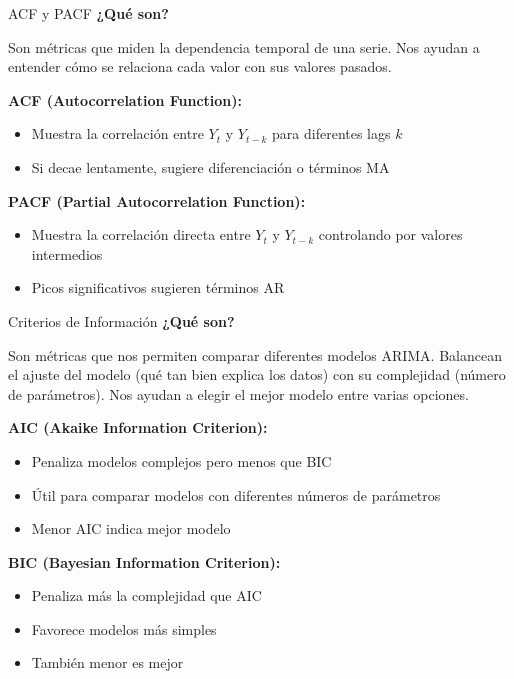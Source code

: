\documentclass{beamer}
\begin{document}
\begin{frame}{ACF y PACF}
    \textbf{¿Qué son?}
    
    Son métricas que miden la dependencia temporal de una serie. Nos ayudan a entender cómo se relaciona cada valor con sus valores pasados.
    
    \textbf{ACF (Autocorrelation Function):}
    \begin{itemize}
        \item Muestra la correlación entre $Y_t$ y $Y_{t-k}$ para diferentes lags $k$
        \item Si decae lentamente, sugiere diferenciación o términos MA
    \end{itemize}
    
    \vspace{0.3cm}
    
    \textbf{PACF (Partial Autocorrelation Function):}
    \begin{itemize}
        \item Muestra la correlación directa entre $Y_t$ y $Y_{t-k}$ controlando por valores intermedios
        \item Picos significativos sugieren términos AR
    \end{itemize}
\end{frame}

\begin{frame}{Criterios de Información}
    \textbf{¿Qué son?}
    
    Son métricas que nos permiten comparar diferentes modelos ARIMA. Balancean el ajuste del modelo (qué tan bien explica los datos) con su complejidad (número de parámetros). Nos ayudan a elegir el mejor modelo entre varias opciones.
    
    \vspace{0.3cm}
    
    \textbf{AIC (Akaike Information Criterion):}
    \begin{itemize}
        \item Penaliza modelos complejos pero menos que BIC
        \item Útil para comparar modelos con diferentes números de parámetros
        \item Menor AIC indica mejor modelo
    \end{itemize}
    
    \vspace{0.3cm}
    
    \textbf{BIC (Bayesian Information Criterion):}
    \begin{itemize}
        \item Penaliza más la complejidad que AIC
        \item Favorece modelos más simples
        \item También menor es mejor
    \end{itemize}
\end{frame}
\end{document}
